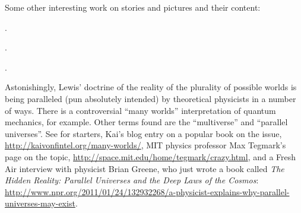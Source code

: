 {Some other interesting work on stories and pictures and their
content:\nocite{zucchi:2001:tense-fiction}
\begin{bibentrylist}
	\item {}.
	\item {}.
	\item {}.
\end{bibentrylist}

% 

Astonishingly, Lewis' doctrine of the reality of the plurality of
possible worlds is being paralleled (pun absolutely intended) by
theoretical physicists in a number of ways. There is a controversial
``many worlds'' interpretation of quantum mechanics, for example.
Other terms found are the ``multiverse'' and ``parallel universes''.
See for starters, Kai's blog entry on a popular book on the issue,
\url{http://kaivonfintel.org/many-worlds/}, MIT physics
professor Max Tegmark's page on the topic,
\url{http://space.mit.edu/home/tegmark/crazy.html}, and a Fresh Air
interview with physicist Brian Greene, who just wrote a book called
\emph{The Hidden Reality: Parallel Universes and the Deep Laws of the
  Cosmos}:
\url{http://www.npr.org/2011/01/24/132932268/a-physicist-explains-why-parallel-universes-may-exist}.
}




